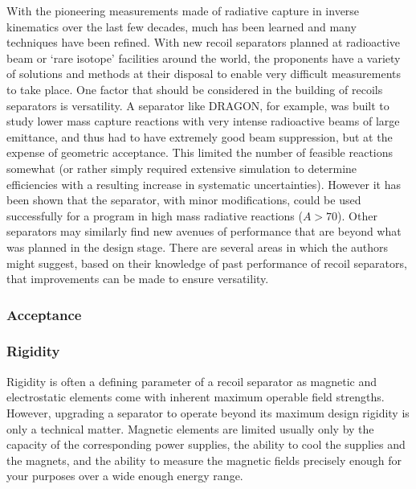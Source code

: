 With the pioneering measurements made of radiative capture in inverse kinematics over the last few decades, much has been learned and many techniques have been refined. With new recoil separators planned at radioactive beam or `rare isotope' facilities around the world, the proponents have a variety of solutions and methods at their disposal to enable very difficult measurements to take place. One factor that should be considered in the building of recoils separators is versatility. A separator like DRAGON, for example, was built to study lower mass capture reactions with very intense radioactive beams of large emittance, and thus had to have extremely good beam suppression, but at the expense of geometric acceptance. This limited the number of feasible reactions somewhat (or rather simply required extensive simulation to determine efficiencies with a resulting increase in systematic uncertainties). However it has been shown that the separator, with minor modifications, could be used successfully for a program in high mass radiative reactions ($A>70$). Other separators may similarly find new avenues of performance that are beyond what was planned in the design stage. There are several areas in which the authors might suggest, based on their knowledge of past performance of recoil separators, that improvements can be made to ensure versatility.

\subsubsection{Acceptance}

\subsubsection{Rigidity}

Rigidity is often a defining parameter of a recoil separator as magnetic and electrostatic elements come with inherent maximum operable field strengths. However, upgrading a separator to operate beyond its maximum design rigidity is only a technical matter. Magnetic elements are limited usually only by the capacity of the corresponding power supplies, the ability to cool the supplies and the magnets, and the ability to measure the magnetic fields precisely enough for your purposes over a wide enough energy range. 

